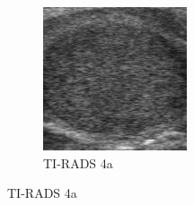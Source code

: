 \documentclass[12pt]{article}
\begin{document}
\begin{figure}[h]
\begin{subfigure}[t]{.3\textwidth}
  \includegraphics[width=.7\linewidth]{images/t_4a_square.jpg}
  \caption{TI-RADS 4a}
  \label{fig:t4as}
\end{subfigure}
\hfill


\end{figure}
\end{document}
